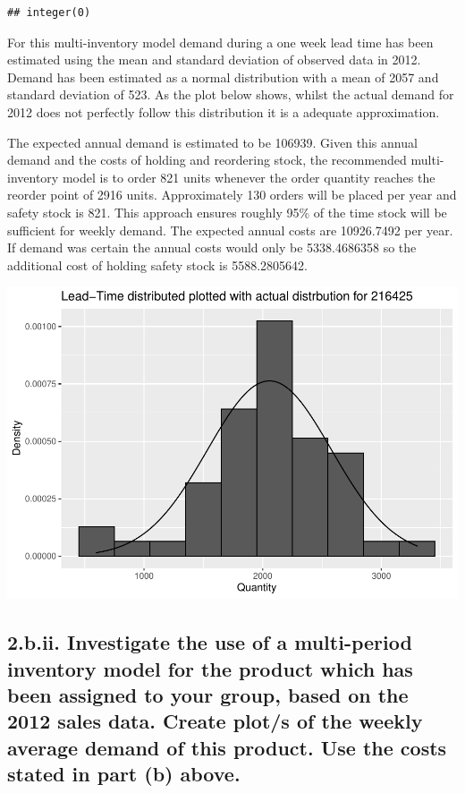 \documentclass[
  11pt,
]{article}
\begin{document}
\begin{verbatim}
## integer(0)
\end{verbatim}

For this multi-inventory model demand during a one week lead time has
been estimated using the mean and standard deviation of observed data in
2012. Demand has been estimated as a normal distribution with a mean of
2057 and standard deviation of 523. As the plot below shows, whilst the
actual demand for 2012 does not perfectly follow this distribution it is
a adequate approximation.

The expected annual demand is estimated to be 106939. Given this annual
demand and the costs of holding and reordering stock, the recommended
multi-inventory model is to order 821 units whenever the order quantity
reaches the reorder point of 2916 units. Approximately 130 orders will
be placed per year and safety stock is 821. This approach ensures
roughly 95\% of the time stock will be sufficient for weekly demand. The
expected annual costs are 10926.7492 per year. If demand was certain the
annual costs would only be 5338.4686358 so the additional cost of
holding safety stock is 5588.2805642.

\includegraphics{Assignment-STAT702_files/figure-latex/2bi plot-1.pdf}

\hypertarget{b.ii.-investigate-the-use-of-a-multi-period-inventory-model-for-the-product-which-has-been-assigned-to-your-group-based-on-the-2012-sales-data.-create-plots-of-the-weekly-average-demand-of-this-product.-use-the-costs-stated-in-part-b-above.}{%
\subsection{2.b.ii. Investigate the use of a multi-period inventory
model for the product which has been assigned to your group, based on
the 2012 sales data. Create plot/s of the weekly average demand of this
product. Use the costs stated in part (b)
above.}\label{b.ii.-investigate-the-use-of-a-multi-period-inventory-model-for-the-product-which-has-been-assigned-to-your-group-based-on-the-2012-sales-data.-create-plots-of-the-weekly-average-demand-of-this-product.-use-the-costs-stated-in-part-b-above.}}
\end{document}
